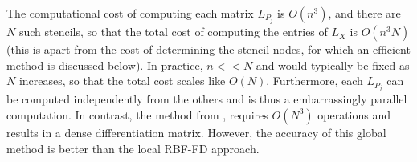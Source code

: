 \documentclass[smallextended]{svjour3}
\newcommand{\vX}{ \mathbf{x} }
\newcommand{\lf}{\left}
\newcommand{\rt}{\right}
\begin{document}
The computational cost of computing each matrix $L_{P_j}$ is $O(n^3)$, and there are $N$ such stencils, so that the total cost of computing the entries of $L_X$ is $O(n^3 N)$ (this is apart from the cost of determining the stencil nodes, for which an efficient method is discussed below).   In practice, $n << N$ and would typically be fixed as $N$ increases, so that the total cost scales like $O(N)$. Furthermore, each $L_{P_j}$ can be computed independently from the others and is thus a embarrassingly parallel computation.  In contrast, the method from \cite{FuselierWright2012}, requires $O(N^3)$ operations and results in a dense differentiation matrix.  However, the accuracy of this global method is better than the local RBF-FD approach.


\end{document}
